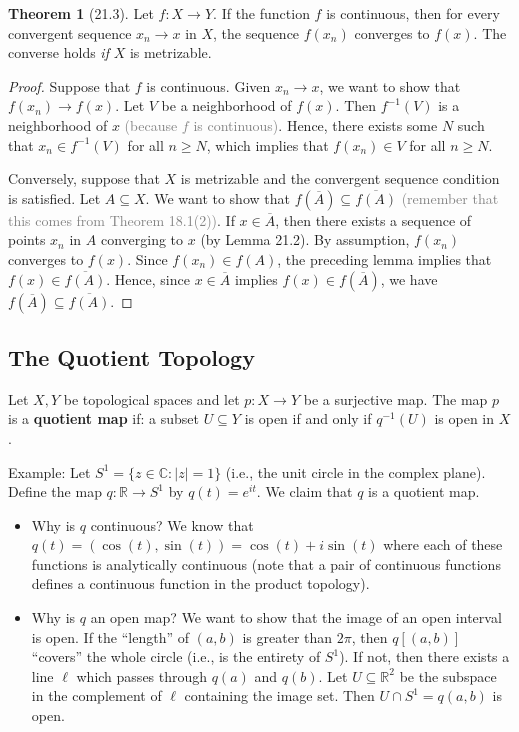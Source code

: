 \documentclass{article}
\newcommand{\nline}{\vspace*{0.5\baselineskip}}
\newcommand{\com}[1]{\textcolor{grey}{#1}}
\theoremstyle{definition}
\newtheorem{theorem}{Theorem}[subsection]
\begin{document}
\begin{flushleft}
\begin{theorem}[21.3]
Let $f : X \to Y$. If the function $f$ is continuous, then for every convergent sequence $x_n \to x$ in $X$, the sequence $f(x_n)$ converges to $f(x)$. The converse holds \textit{if} $X$ is metrizable.
\end{theorem}

\begin{proof}
Suppose that $f$ is continuous. Given $x_n \to x$, we want to show that $f(x_n) \to f(x)$. Let $V$ be a neighborhood of $f(x)$. Then $f^{-1}(V)$ is a neighborhood of $x$ \com{(because $f$ is continuous)}. Hence, there exists some $N$ such that $x_n \in f^{-1}(V)$ for all $n \geq N$, which implies that $f(x_n) \in V$ for all $n \geq N$.

\nline

Conversely, suppose that $X$ is metrizable and the convergent sequence condition is satisfied. Let $A \subseteq X$. We want to show that $f(\overline{A}) \subseteq \overline{f(A)}$ \com{(remember that this comes from Theorem 18.1(2))}. If $x \in \overline{A}$, then there exists a sequence of points $x_n$ in $A$ converging to $x$ (by Lemma 21.2). By assumption, $f(x_n)$ converges to $f(x)$. Since $f(x_n) \in f(A)$, the preceding lemma implies that $f(x) \in \overline{f(A)}$. Hence, since $x \in \overline{A}$ implies $f(x) \in f(\overline{A})$, we have $f(\overline{A}) \subseteq \overline{f(A)}$.
\end{proof}

\subsection{The Quotient Topology}

Let $X, Y$ be topological spaces and let $p : X \to Y$ be a surjective map. The map $p$ is a \textbf{quotient map} if: a subset $U \subseteq Y$ is open if and only if $q^{-1}(U)$ is open in $X$.

\nline

Example: Let $S^1 = \{ z \in \mathbb{C} : |z| = 1\}$ (i.e., the unit circle in the complex plane). Define the map $q: \mathbb{R} \to S^1$ by $q(t) = e^{it}$. We claim that $q$ is a quotient map.
\begin{itemize}
    \item Why is $q$ continuous? We know that $q(t) = (\cos(t), \sin(t)) = \cos(t) + i\sin(t)$ where each of these functions is analytically continuous (note that a pair of continuous functions defines a continuous function in the product topology).
    \item Why is $q$ an open map? We want to show that the image of an open interval is open. If the ``length'' of $(a,b)$ is greater than $2\pi$, then $q[(a,b)]$ ``covers'' the whole circle (i.e., is the entirety of $S^1$). If not, then there exists a line $\ell$ which passes through $q(a)$ and $q(b)$. Let $U \subseteq \mathbb{R}^2$ be the subspace in the complement of $\ell$ containing the image set. Then $U \cap S^1 = q(a,b)$ is open.
\end{itemize}


\end{flushleft}
\end{document}
